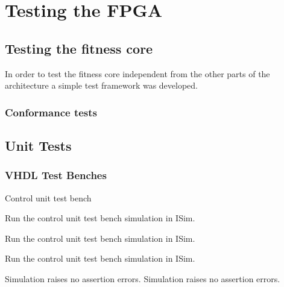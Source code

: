 \section{Testing the FPGA}


\subsection{Testing the fitness core}
In order to test the fitness core independent from the other parts of the architecture a simple test framework was developed. 



\subsubsection{Conformance tests}




























\subsection{Unit Tests}


\subsubsection{VHDL Test Benches}

\test
{Control unit test bench}{
    \item{Run the control unit test bench simulation in ISim.}
    \item{Run the control unit test bench simulation in ISim.}
    \item{Run the control unit test bench simulation in ISim.}
}{Simulation raises no assertion errors.}
{Simulation raises no assertion errors.}

